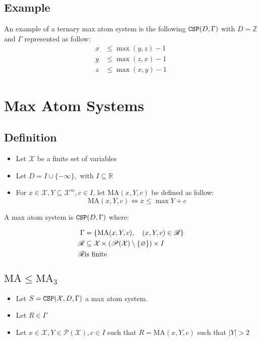 \subsection{Example}
An example of a ternary max atom system is the following $\operatorname{\mathtt{CSP}}(D,\Gamma)$ with $D=\mathbb{Z}$ and $\Gamma$ represented as follow:
\begin{align*}
	x &\le \max(y,z)-1 \\
	y &\le \max(z,x)-1 \\
	z & \le \max(x,y)-1
\end{align*}


\section{Max Atom Systems}
\subsection{Definition}
\begin{itemize}
	\item Let $\mathcal{X}$ be a finite set of variables
	\item Let $D=I\cup \{-\infty\},$ with $I\subseteq \mathbb{R}$   
	\item For $x\in \mathcal{X},Y\subseteq\mathcal{X}^m,c\in I$, let $\text{MA}(x,Y,c)$ be defined as follow:
	$$
	\text{MA}(x,Y,c)\iff x\le \max Y+c
	$$
\end{itemize}

A max atom system is $\operatorname{\mathtt{CSP}}(D,\Gamma)$ where:

\begin{align*}
	\Gamma&=\left\{\text{MA}(x,Y,c),\quad (x,Y,c)\in \mathscr{R}\right\}\\
	\mathscr{R}&\subseteq \mathcal{X}\times \left(\mathscr{P}(\mathcal{X}) \setminus \{\varnothing\}\right)\times I \\
	\mathscr{R}&\space \text{is finite}
\end{align*}

\subsection{$\text{MA} \le \text{MA}_3$}
\begin{itemize}
	\item Let $S=\operatorname{\mathtt{CSP}}(\mathcal{X},D,\Gamma)$ a max atom system.
	\item Let $R\in \Gamma$
	\item Let $x\in \mathcal{X},Y\in\mathscr{P}(\mathcal{X}),c\in I$ such that $R=\text{MA}(x,Y,c)$ such that $\lvert Y \rvert >2$
\end{itemize}

